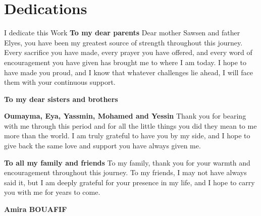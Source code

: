 \chapter*{Dedications}
\begin{center}
    \vskip0.5cm
    I dedicate this Work
    \vskip0.5cm
    \textbf{To my dear parents}
    \vskip0.2cm
    Dear mother Sawsen and father Elyes, you have been my greatest source of strength throughout this journey. Every sacrifice you have made, every prayer you have offered, and every word of encouragement you have given has brought me to where I am today. I hope to have made you proud, and I know that whatever challenges lie ahead, I will face them with your continuous support.

    \vskip0.5cm
    \textbf{To my dear sisters and brothers}

    \textbf{Oumayma, Eya, Yassmin, Mohamed and Yessin}
    \vskip0.2cm
    Thank you for bearing with me through this period and for all the little things you did they mean to me more than the world. I am truly grateful to have you by my side, and I hope to give back the same love and support you have always given me.

    \vskip0.5cm
    \textbf{To all my family and friends}
    \vskip0.2cm
    To my family, thank you for your warmth and encouragement throughout this journey. To my friends, I may not have always said it, but I am deeply grateful for your presence in my life, and I hope to carry you with me for years to come.
\end{center}
\vskip1cm
\hfill \textbf{Amira BOUAFIF}